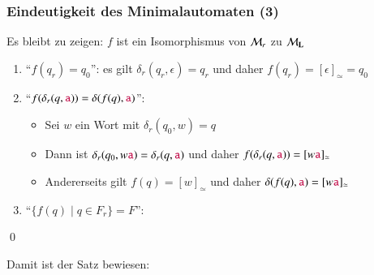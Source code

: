 \documentclass[aspectratio=1610,onlymath]{beamer}
\begin{document}
\begin{frame}[t]\frametitle{Eindeutigkeit des Minimalautomaten (3)}

Es bleibt zu zeigen: $f$ ist ein Isomorphismus von $\mathcal{M}_r$ zu $\mathcal{M}_{\textbf{\textcolor{black}{L}}}$\pause

\begin{enumerate}[(1)]
\item "`$f(q_r)=q_0$"': \pause es gilt $\delta_r(q_r,\epsilon)=q_r$ und daher $f(q_r)=[\epsilon]_\simeq=q_0$ \pause
\item "`$f(\delta_r(q,\mathtt{\textcolor{purple}{a}})) = \delta(f(q),\mathtt{\textcolor{purple}{a}})$"': \pause
	\begin{itemize}
	\item Sei $w$ ein Wort mit $\delta_r(q_0,w)=q$\pause
	\item Dann ist $\delta_r(q_0,w\mathtt{\textcolor{purple}{a}})=\delta_r(q,\mathtt{\textcolor{purple}{a}})$ und daher $f(\delta_r(q,\mathtt{\textcolor{purple}{a}}))=[w\mathtt{\textcolor{purple}{a}}]_\simeq$\pause
	\item Andererseits gilt $f(q)=[w]_\simeq$ und daher $\delta(f(q),\mathtt{\textcolor{purple}{a}})=[w\mathtt{\textcolor{purple}{a}}]_\simeq$
	\end{itemize}\pause
\item "`$\{f(q)\mid q\in F_r\}=F$"': \pause
\end{enumerate}
\pause

\qed
\bigskip

Damit ist der Satz bewiesen:


\end{frame}
\end{document}

